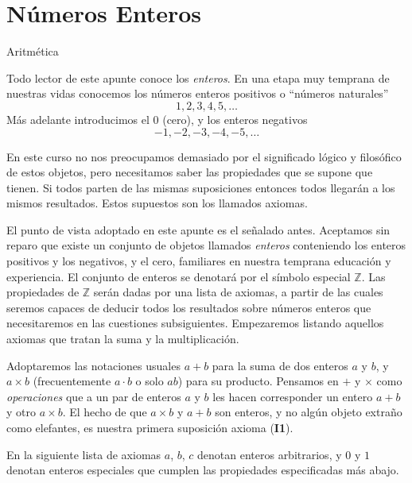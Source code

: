 
\chapter[Números Enteros]{Números Enteros}



\begin{section}{Aritmética}\label{1.1}

Todo lector de este apunte conoce los {\it enteros}. En una etapa
muy temprana de nuestras vidas conocemos los números enteros
positivos o ``números naturales'' $$1,2,3,4,5,\ldots$$ Más
adelante introducimos el $0$ (cero), y los enteros negativos $$
-1,-2,-3,-4,-5,\ldots $$ 

En este curso no nos
preocupamos demasiado por el significado lógico y filosófico de estos
objetos, pero necesitamos saber las propiedades que se supone que
tienen. Si todos parten de las mismas suposiciones entonces todos
llegarán a los mismos resultados. Estos supuestos son los llamados
axio\-mas.

El punto de vista adoptado en este apunte es el señalado antes.
Aceptamos sin reparo que existe un conjunto de objetos llamados {
\it enteros} conteniendo los enteros positivos y los negativos, y
el cero, familiares en nuestra temprana educación y experiencia.
El conjunto de enteros se denotará por el símbolo especial
${\mathbb Z}$. Las propiedades de ${\mathbb Z}$ serán dadas por
una lista de axiomas, a partir de las cuales seremos capaces de
deducir todos los resultados sobre números enteros que
necesitaremos en las cuestiones subsiguientes. Empezaremos
listando aquellos axiomas que tratan la suma y la multiplicación.

Adoptaremos las notaciones usuales $a+b$ para la suma de dos
enteros $a$ y $b$, y $a \times b$ (frecuentemente $a \cdot b$ o solo $ab$)
para su producto. Pensamos en $+$ y $\times$ como {\it
operaciones} que a un par de enteros $a$ y $b$ les hacen
corresponder un entero $a+b$ y otro $a\times b$. El hecho de que
$a \times b$ y $a+b$ son enteros, y no algún objeto extra\~no como
elefantes, es nuestra primera suposición axioma ({\bf I1}). 





En la siguiente lista de axiomas $a$, $b$, $c$ denotan enteros arbitrarios, y $0$ y $1$ denotan enteros especiales que cumplen las propiedades especificadas más abajo.


\end{section}

